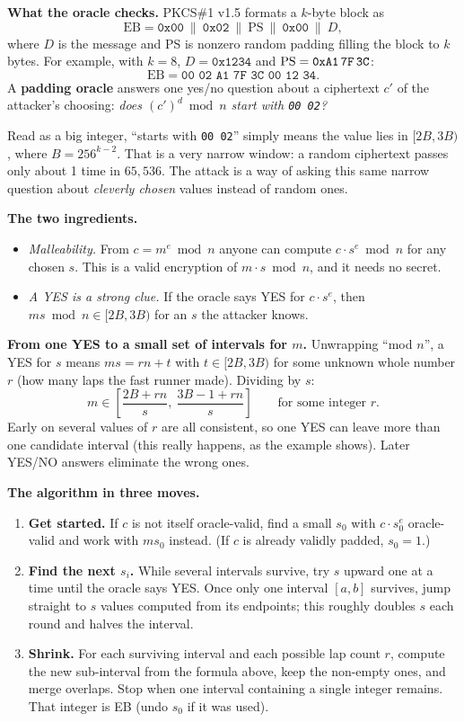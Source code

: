 \documentclass[11pt]{article}
\begin{document}
\textbf{What the oracle checks.} PKCS\#1 v1.5 formats a $k$-byte block as
\[
\text{EB} = \texttt{0x00}\ \|\ \texttt{0x02}\ \|\ \text{PS}\ \|\ \texttt{0x00}\ \|\ D,
\]
where $D$ is the message and PS is nonzero random padding filling the block to $k$ bytes. For example, with $k=8$, $D=\texttt{0x1234}$ and $\text{PS}=\texttt{0xA1\,7F\,3C}$:
\[
\text{EB}=\texttt{00\ 02\ A1\ 7F\ 3C\ 00\ 12\ 34}.
\]
A \textbf{padding oracle} answers one yes/no question about a ciphertext $c'$ of the attacker's choosing: \emph{does $(c')^d \bmod n$ start with \texttt{00 02}?}

Read as a big integer, ``starts with \texttt{00 02}'' simply means the value lies in $[2B,3B)$, where $B=256^{k-2}$. That is a very narrow window: a random ciphertext passes only about 1 time in $65{,}536$. The attack is a way of asking this same narrow question about \emph{cleverly chosen} values instead of random ones.

\textbf{The two ingredients.}
\begin{itemize}[nosep]
\item \emph{Malleability.} From $c=m^e\bmod n$ anyone can compute $c\cdot s^e\bmod n$ for any chosen $s$. This is a valid encryption of $m\cdot s \bmod n$, and it needs no secret.
\item \emph{A YES is a strong clue.} If the oracle says YES for $c\cdot s^e$, then $ms \bmod n\in[2B,3B)$ for an $s$ the attacker knows.
\end{itemize}

\textbf{From one YES to a small set of intervals for $m$.} Unwrapping ``mod $n$'', a YES for $s$ means $ms = rn + t$ with $t \in [2B,3B)$ for some unknown whole number $r$ (how many laps the fast runner made). Dividing by $s$:
\[
m\in\left[\frac{2B+rn}{s},\ \frac{3B-1+rn}{s}\right]\qquad\text{for some integer } r.
\]
Early on several values of $r$ are all consistent, so one YES can leave more than one candidate interval (this really happens, as the example shows). Later YES/NO answers eliminate the wrong ones.

\textbf{The algorithm in three moves.}
\begin{enumerate}[nosep]
\item \textbf{Get started.} If $c$ is not itself oracle-valid, find a small $s_0$ with $c\cdot s_0^e$ oracle-valid and work with $ms_0$ instead. (If $c$ is already validly padded, $s_0=1$.)
\item \textbf{Find the next $s_i$.} While several intervals survive, try $s$ upward one at a time until the oracle says YES. Once only one interval $[a,b]$ survives, jump straight to $s$ values computed from its endpoints; this roughly doubles $s$ each round and halves the interval.
\item \textbf{Shrink.} For each surviving interval and each possible lap count $r$, compute the new sub-interval from the formula above, keep the non-empty ones, and merge overlaps. Stop when one interval containing a single integer remains. That integer is EB (undo $s_0$ if it was used).
\end{enumerate}
\end{document}
